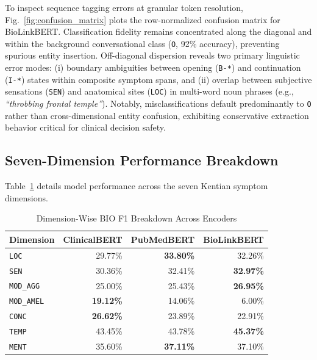 To inspect sequence tagging errors at granular token resolution, Fig.~\ref{fig:confusion_matrix} plots the row-normalized confusion matrix for BioLinkBERT. Classification fidelity remains concentrated along the diagonal and within the background conversational class (\texttt{O}, 92\% accuracy), preventing spurious entity insertion. Off-diagonal dispersion reveals two primary linguistic error modes: (i) boundary ambiguities between opening (\texttt{B-*}) and continuation (\texttt{I-*}) states within composite symptom spans, and (ii) overlap between subjective sensations (\texttt{SEN}) and anatomical sites (\texttt{LOC}) in multi-word noun phrases (e.g., \textit{``throbbing frontal temple''}). Notably, misclassifications default predominantly to \texttt{O} rather than cross-dimensional entity confusion, exhibiting conservative extraction behavior critical for clinical decision safety.

\subsection{Seven-Dimension Performance Breakdown}

Table~\ref{tab:dimension_breakdown} details model performance across the seven Kentian symptom dimensions.

\begin{table}[!t]
\caption{Dimension-Wise BIO F1 Breakdown Across Encoders}
\label{tab:dimension_breakdown}
\centering
\footnotesize
\begin{tabular*}{\columnwidth}{@{\extracolsep{\fill}}lrrr@{}}
\toprule
\textbf{Dimension} & \textbf{ClinicalBERT} & \textbf{PubMedBERT} & \textbf{BioLinkBERT} \\
\midrule
\texttt{LOC} & 29.77\% & \textbf{33.80\%} & 32.26\% \\
\texttt{SEN} & 30.36\% & 32.41\% & \textbf{32.97\%} \\
\texttt{MOD\_AGG} & 25.00\% & 25.43\% & \textbf{26.95\%} \\
\texttt{MOD\_AMEL} & \textbf{19.12\%} & 14.06\% & 6.00\% \\
\texttt{CONC} & \textbf{26.62\%} & 23.89\% & 22.91\% \\
\texttt{TEMP} & 43.45\% & 43.78\% & \textbf{45.37\%} \\
\texttt{MENT} & 35.60\% & \textbf{37.11\%} & 37.10\% \\
\bottomrule
\end{tabular*}
\end{table}

